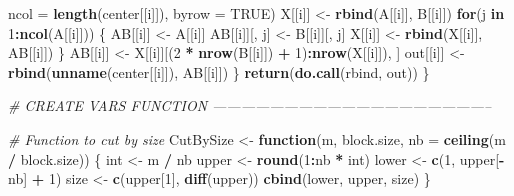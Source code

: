 \documentclass[11pt,]{article}
\newenvironment{Shaded}{\begin{snugshade}}{\end{snugshade}}
\newcommand{\CommentTok}[1]{\textcolor[rgb]{0.56,0.35,0.01}{\textit{#1}}}
\newcommand{\ControlFlowTok}[1]{\textcolor[rgb]{0.13,0.29,0.53}{\textbf{#1}}}
\newcommand{\DataTypeTok}[1]{\textcolor[rgb]{0.13,0.29,0.53}{#1}}
\newcommand{\DecValTok}[1]{\textcolor[rgb]{0.00,0.00,0.81}{#1}}
\newcommand{\KeywordTok}[1]{\textcolor[rgb]{0.13,0.29,0.53}{\textbf{#1}}}
\newcommand{\NormalTok}[1]{#1}
\newcommand{\OperatorTok}[1]{\textcolor[rgb]{0.81,0.36,0.00}{\textbf{#1}}}
\newcommand{\OtherTok}[1]{\textcolor[rgb]{0.56,0.35,0.01}{#1}}
\newcommand{\StringTok}[1]{\textcolor[rgb]{0.31,0.60,0.02}{#1}}
\begin{document}
\begin{Shaded}
\begin{Highlighting}[]
{{                     \DataTypeTok{ncol =} \KeywordTok{length}\NormalTok{(center[[i]]), }\DataTypeTok{byrow =} \OtherTok{TRUE}\NormalTok{)}
\NormalTok{    X[[i]] <-}\StringTok{ }\KeywordTok{rbind}\NormalTok{(A[[i]], B[[i]])}
    \ControlFlowTok{for}\NormalTok{(j }\ControlFlowTok{in} \DecValTok{1}\OperatorTok{:}\KeywordTok{ncol}\NormalTok{(A[[i]])) \{}
\NormalTok{      AB[[i]] <-}\StringTok{ }\NormalTok{A[[i]]}
\NormalTok{      AB[[i]][, j] <-}\StringTok{ }\NormalTok{B[[i]][, j]}
\NormalTok{      X[[i]] <-}\StringTok{ }\KeywordTok{rbind}\NormalTok{(X[[i]], AB[[i]])}
\NormalTok{    \}}
\NormalTok{    AB[[i]] <-}\StringTok{ }\NormalTok{X[[i]][(}\DecValTok{2} \OperatorTok{*}\StringTok{ }\KeywordTok{nrow}\NormalTok{(B[[i]]) }\OperatorTok{+}\StringTok{ }\DecValTok{1}\NormalTok{)}\OperatorTok{:}\KeywordTok{nrow}\NormalTok{(X[[i]]), ]}
\NormalTok{    out[[i]] <-}\StringTok{ }\KeywordTok{rbind}\NormalTok{(}\KeywordTok{unname}\NormalTok{(center[[i]]), AB[[i]])}
\NormalTok{  \}}
  \KeywordTok{return}\NormalTok{(}\KeywordTok{do.call}\NormalTok{(rbind, out))}
\NormalTok{\}}

\CommentTok{# CREATE VARS FUNCTION -----------------------------------------------------------}

\CommentTok{# Function to cut by size}
\NormalTok{CutBySize <-}\StringTok{ }\ControlFlowTok{function}\NormalTok{(m, block.size, }\DataTypeTok{nb =} \KeywordTok{ceiling}\NormalTok{(m }\OperatorTok{/}\StringTok{ }\NormalTok{block.size)) \{}
\NormalTok{  int <-}\StringTok{ }\NormalTok{m }\OperatorTok{/}\StringTok{ }\NormalTok{nb}
\NormalTok{  upper <-}\StringTok{ }\KeywordTok{round}\NormalTok{(}\DecValTok{1}\OperatorTok{:}\NormalTok{nb }\OperatorTok{*}\StringTok{ }\NormalTok{int)}
\NormalTok{  lower <-}\StringTok{ }\KeywordTok{c}\NormalTok{(}\DecValTok{1}\NormalTok{, upper[}\OperatorTok{-}\NormalTok{nb] }\OperatorTok{+}\StringTok{ }\DecValTok{1}\NormalTok{)}
\NormalTok{  size <-}\StringTok{ }\KeywordTok{c}\NormalTok{(upper[}\DecValTok{1}\NormalTok{], }\KeywordTok{diff}\NormalTok{(upper))}
  \KeywordTok{cbind}\NormalTok{(lower, upper, size)}
\NormalTok{\}}

}}
\end{Highlighting}
\end{Shaded}
\end{document}
